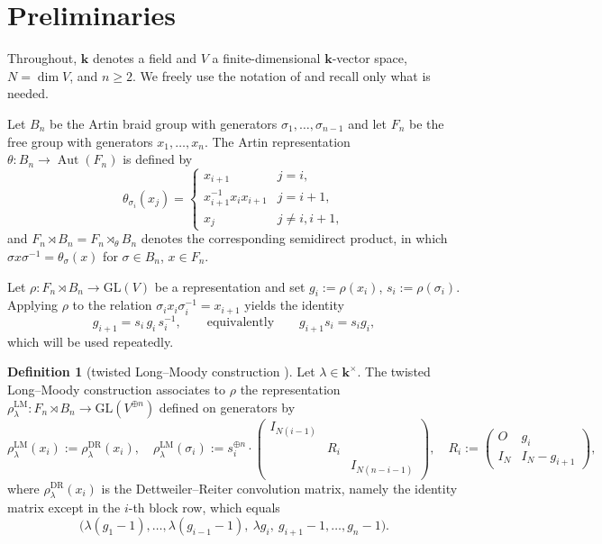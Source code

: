 \documentclass[11pt]{article}
\theoremstyle{definition}
\newtheorem{definition}[theorem]{Definition}
\theoremstyle{remark}
\newcommand{\GL}{\mathrm{GL}}
\newcommand{\kk}{\boldsymbol{k}}
\newcommand{\rLMl}{\rho^{\mathrm{LM}}_{\lambda}}
\newcommand{\rDR}{\rho^{\mathrm{DR}}_{\lambda}}
\begin{document}
\section{Preliminaries}\label{sec:prelim}

Throughout, $\kk$ denotes a field and $V$ a finite-dimensional
$\kk$-vector space, $N = \dim V$, and $n \geq 2$. We freely use the
notation of \cite{HiroeNegami23, Negami25} and recall only what is needed.

Let $B_n$ be the Artin braid group with generators
$\sigma_1, \dots, \sigma_{n-1}$ and let $F_n$ be the free group with
generators $x_1, \dots, x_n$. The Artin representation
$\theta \colon B_n \to \operatorname{Aut}(F_n)$ is defined by
\begin{equation}\label{eq:artin}
\theta_{\sigma_i}(x_j) =
\begin{cases}
x_{i+1} & j = i,\\
x_{i+1}^{-1} x_i x_{i+1} & j = i+1,\\
x_j & j \neq i, i+1,
\end{cases}
\end{equation}
and $F_n \rtimes B_n = F_n \rtimes_{\theta} B_n$ denotes the corresponding
semidirect product, in which $\sigma x \sigma^{-1} = \theta_{\sigma}(x)$
for $\sigma \in B_n$, $x \in F_n$.

Let $\rho \colon F_n \rtimes B_n \to \GL(V)$ be a representation and set
$g_i := \rho(x_i)$, $s_i := \rho(\sigma_i)$. Applying $\rho$ to the
relation $\sigma_i x_i \sigma_i^{-1} = x_{i+1}$ yields the identity
\begin{equation}\label{eq:key}
g_{i+1} = s_i\, g_i\, s_i^{-1}, \qquad \text{equivalently} \qquad
g_{i+1} s_i = s_i g_i,
\end{equation}
which will be used repeatedly.

\begin{definition}[twisted Long--Moody construction
\cite{HiroeNegami23, Negami25}]\label{def:LM}
Let $\lambda \in \kk^{\times}$. The twisted Long--Moody construction
associates to $\rho$ the representation
$\rLMl \colon F_n \rtimes B_n \to \GL(V^{\oplus n})$ defined on generators by
\[
\rLMl(x_i) := \rDR(x_i), \quad
\rLMl(\sigma_i) := s_i^{\oplus n} \cdot
\begin{pmatrix}
I_{N(i-1)} & & \\
& R_i & \\
& & I_{N(n-i-1)}
\end{pmatrix}, \quad
R_i :=
\begin{pmatrix}
O & g_i \\ I_N & I_N - g_{i+1}
\end{pmatrix},
\]
where $\rDR(x_i)$ is the Dettweiler--Reiter convolution matrix, namely the
identity matrix except in the $i$-th block row, which equals
\[
\bigl(\lambda(g_1 - 1), \dots, \lambda(g_{i-1} - 1),\ \lambda g_i,\
g_{i+1} - 1, \dots, g_n - 1\bigr).
\]
\end{definition}
\end{document}
